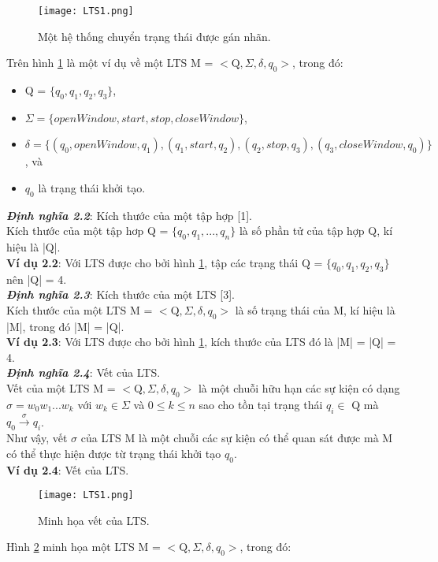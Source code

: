 \documentclass[a4paper,13pt,oneside,openany]{book}
\begin{document}
\begin{flushleft}
\begin{figure}[h]
			\centering
			\texttt{[image: LTS1.png]}
			\caption{Một hệ thống chuyển trạng thái được gán nhãn.}
			\label{fig:LTS1}
		\end{figure}
		Trên hình \ref{fig:LTS1} là một ví dụ về một LTS M = $<\textrm{Q}, \Sigma, \delta, q_{0}>$, trong đó:
		\begin{itemize}
			\item Q = $\{q_0, q_1, q_2, q_3\}$,
			\item $\Sigma = \{openWindow, start, stop, closeWindow\}$,
			\item $\delta = \{(q_0, openWindow, q_1), (q_1, start, q_2), (q_2, stop, q_3), (q_3, closeWindow, q_0)\}$, và
			\item $q_0$ là trạng thái khởi tạo.
		\end{itemize}
		\textbf{\textit{Định nghĩa 2.2}}: Kích thước của một tập hợp [1].\\
		Kích thước của một tập hơp Q = $\{q_0, q_1, ..., q_n\}$ là số phần tử của tập hợp Q, kí hiệu là |Q|.\\
		\textbf{Ví dụ 2.2}: Với LTS được cho bởi hình \ref{fig:LTS1}, tập các trạng thái Q = $\{q_0, q_1, q_2, q_3\}$ nên |Q| = 4.\\
		\textbf{\textit{Định nghĩa 2.3}}: Kích thước của một LTS [3].\\
		Kích thước của một LTS M = $<\textrm{Q}, \Sigma, \delta, q_{0}>$ là số trạng thái của M, kí hiệu là |M|, trong đó |M| = |Q|.\\
		\textbf{Ví dụ 2.3}: Với LTS được cho bởi hình \ref{fig:LTS1}, kích thước của LTS đó là |M| = |Q| = 4.\\
		\textbf{\textit{Định nghĩa 2.4}}: Vết của LTS.\\
		Vết của một LTS M = $<\textrm{Q}, \Sigma, \delta, q_{0}>$ là một chuỗi hữu hạn các sự kiện có dạng $\sigma = w_0w_1...w_k$ với $w_k \in \Sigma$ và $0 \leq k \leq n$ sao cho tồn tại trạng thái $q_i \in$ Q mà $q_0 \overset{\sigma}{\longrightarrow} q_{i}$.\\
		Như vậy, vết $\sigma$ của LTS M là một chuỗi các sự kiện có thể quan sát được mà M có thể thực hiện được từ trạng thái khởi tạo $q_0$.\\
		\textbf{Ví dụ 2.4}: Vết của LTS.\\
		\begin{figure}[h]
			\centering
			\texttt{[image: LTS1.png]}
			\caption{Minh họa vết của LTS.}
			\label{fig:LTS2}
		\end{figure}
		Hình \ref{fig:LTS2} minh họa một LTS M = $<\textrm{Q}, \Sigma, \delta, q_{0}>$, trong đó:

\end{flushleft}
\end{document}
